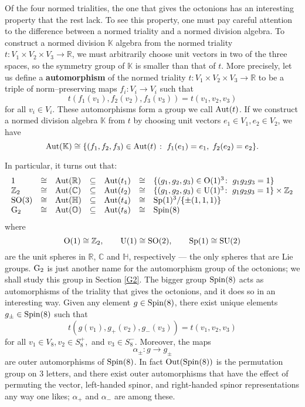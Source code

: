 \documentclass[12pt]{article}
\newcommand\Z{{\mathbb Z}}
\newcommand\R{{\mathbb R}}
\newcommand\C{{\mathbb C}}
\renewcommand\H{{\mathbb H}}
\newcommand\K{{\mathbb K}}
\renewcommand\O{{\mathbb O}}
\newcommand{\OO}{{\rm O}}
\newcommand{\SO}{{\rm SO}}
\newcommand{\SU}{{\rm SU}}
\newcommand{\Sp}{{\rm Sp}}
\newcommand{\Spin}{{\rm Spin}}
\newcommand{\U}{{\rm U}}
\newcommand{\G}{{\rm G}}
\newcommand{\Aut}{{\rm Aut}}
\newcommand{\iso}{\cong}
\newcommand{\be}{\begin{equation}}
\newcommand{\ee}{\end{equation}}
\newcommand{\maps}{\colon}
\begin{document}
Of the four normed trialities, the one that gives the octonions 
has an interesting property that the rest lack.  To see this property, 
one must pay careful attention to the difference between a normed triality 
and a normed division algebra.  To construct a normed division $\K$ 
algebra from the normed triality $t \maps V_1 \times V_2 \times V_3 \to \R$, 
we must arbitrarily choose unit vectors in two of the three spaces, so 
the symmetry group of $\K$ is smaller than that of $t$.  More precisely,  
let us define a {\bf automorphism} of the normed triality $t \maps V_1 \times 
V_2 \times V_3 \to \R$ to be a triple of norm--preserving maps  
$f_i \maps V_i \to V_i$ such that  
\[        t(f_1(v_1), f_2(v_2), f_3(v_3)) = t(v_1,v_2,v_3)  \] 
for all $v_i \in V_i$.   These automorphisms form a group we call  
$\Aut(t)$.  If we construct a normed division algebra $\K$ from $t$ 
by choosing unit vectors $e_1 \in V_1, e_2 \in V_2$, we have  
\[   
\Aut(\K) \iso \{(f_1,f_2,f_3) \in \Aut(t)\; \colon \; f_1(e_1) = e_1,  
\; f_2(e_2) = e_2 \} . 
\] 
 
In particular, it turns out that: 
\be
\begin{array}{lclclcl} 
    1 &\iso& \Aut(\R) & \subseteq& \Aut(t_1) & \iso &
\{ (g_1,g_2,g_3) \in \OO(1)^3 \colon \; g_1g_2g_3 = 1 \}  \\        
    \Z_2 &\iso& \Aut(\C) & \subseteq& \Aut(t_2)& \iso &
\{ (g_1,g_2,g_3) \in \U(1)^3 \colon \; g_1g_2g_3 = 1 \} \times \Z_2  \\        
    \SO(3) &\iso& \Aut(\H) &\subseteq &\Aut(t_4)& \iso  &
\Sp(1)^3 / \{ \pm(1,1,1) \} \\ 
     \G_2 &\iso& \Aut(\O) &\subseteq& \Aut(t_8)& \iso& \Spin(8)  
\end{array} 
\label{Aut(t)}
\ee
where 
\[ \OO(1) \iso \Z_2, \qquad \U(1) \iso \SO(2) , \qquad \Sp(1) \iso \SU(2) \] 
are the unit spheres in $\R$, $\C$ and $\H$, respectively ---
the only spheres that are Lie groups.
$\G_2$ is just another name for the automorphism group of 
the octonions; we shall study this group in Section \ref{G2}.   
The bigger group $\Spin(8)$ acts as automorphisms of the triality  
that gives the octonions, and it does so in an interesting way.
Given any element $g \in \Spin(8)$, there exist unique elements
$g_\pm \in \Spin(8)$ such that 
\[      t(g(v_1), g_+(v_2), g_-(v_3)) = t(v_1,v_2,v_3)  \] 
for all $v_1 \in V_8, v_2 \in S^+_8,$ and $v_3 \in S^-_8$.
Moreover, the maps 
\[   \alpha_\pm \maps g \to g_\pm  \] 
are outer automorphisms of $\Spin(8)$.  In fact ${\rm Out(\Spin(8))}$
is the permutation group on 3 letters, and there exist outer
automorphisms that have the effect of permuting the vector, left-handed
spinor, and right-handed spinor representations any way one likes;
$\alpha_+$ and $\alpha_-$ are among these.   
\end{document}
